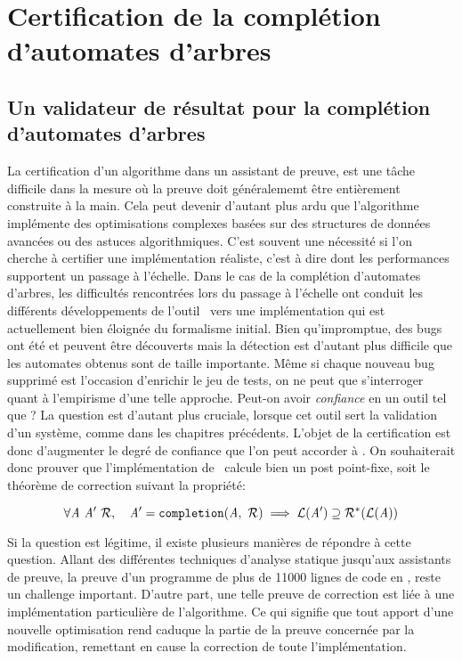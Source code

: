 
\chapter{Certification de la complétion d'automates d'arbres}
\label{chap:certif}


\switchlstcoq 

\section{Un validateur de résultat pour la complétion d'automates d'arbres}
\label{sec:objectives}


La certification d'un algorithme dans un assistant de preuve, est une tâche difficile dans la mesure
où la preuve doit généralememt être entièrement construite à la main. Cela peut devenir d'autant plus ardu que l'algorithme implémente
des optimisations complexes basées sur des structures de données
avancées ou des astuces algorithmiques. C'est souvent une nécessité  si l'on cherche à certifier une implémentation réaliste,
c'est à dire dont les performances supportent un passage à l'échelle. 
Dans le cas de la complétion d'automates d'arbres, les difficultés rencontrées lors du passage à l'échelle ont
conduit les différents développements de l'outil \timbuk\ vers une implémentation qui est actuellement bien éloignée du formalisme initial.
Bien qu'impromptue, des bugs ont été et peuvent être découverts mais la détection est d'autant plus difficile que les automates
obtenus sont de taille importante. Même si chaque nouveau bug supprimé est l'occasion d'enrichir le jeu de tests, on ne peut que
s'interroger quant à l'empirisme d'une telle approche.
Peut-on avoir {\em confiance} en un outil tel que \timbuk? La question est d'autant plus cruciale, lorsque cet outil sert
la validation d'un système, comme dans les chapitres précédents.
L'objet de la certification est donc d'augmenter le degré de confiance que l'on peut accorder à \timbuk.
On souhaiterait donc prouver que l'implémentation de \timbuk\ calcule bien un post point-fixe, soit 
le théorème de correction suivant la propriété:

\[\forall \mathit A\ \mathit A'\ \mathcal R,\quad \mathit A' = \mathtt{completion}(\mathit A,\ \mathcal R) \; \Longrightarrow \; \mathcal{L}(\mathit A') \supseteq \mathcal R^*(\mathcal{L}(\mathit A))\]

Si la question est légitime, il existe plusieurs manières de répondre à cette question. Allant des différentes
techniques d'analyse statique jusqu'aux assistants de preuve, la preuve d'un programme de plus de 11000 lignes
de code en \ocaml, reste un challenge important. D'autre part, une telle preuve de correction est liée 
à une implémentation particulière de l'algorithme. Ce qui signifie que tout apport d'une nouvelle optimisation
rend caduque la partie de la preuve concernée par la modification, remettant en cause la correction de toute
l'implémentation.

